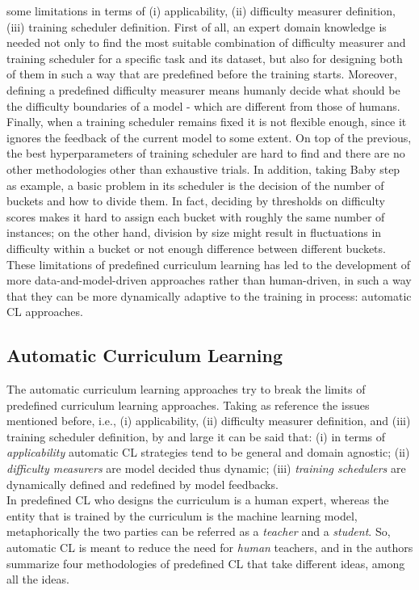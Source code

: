 some limitations in terms of (i) applicability, (ii) difficulty measurer definition, (iii) training scheduler definition.
First of all, an expert domain knowledge is needed not only to find the most suitable
combination of difficulty measurer and training scheduler for a specific task and its dataset, 
but also for designing both of them in such a way that are predefined before the training starts.
Moreover, defining a predefined difficulty measurer means humanly decide what should be the difficulty boundaries of a model - which are
different from those of humans. Finally, when a training scheduler remains fixed 
it is not flexible enough, since it ignores the feedback of the current model to some extent.
On top of the previous, the best hyperparameters of training scheduler are hard to find and there are no 
other methodologies other than exhaustive trials. In addition, taking Baby step as example, 
a basic problem in its scheduler is the decision of the number of buckets and how to divide them. In fact, 
deciding by thresholds on difficulty scores makes it hard to assign each bucket with roughly the same number of instances; on 
the other hand, division by size might result in fluctuations in difficulty within a bucket or not enough difference between different 
buckets.\\

These limitations of predefined curriculum learning has led to the development 
of more data-and-model-driven approaches rather than human-driven, in such a way 
that they can be more dynamically adaptive to the training in process: automatic 
CL approaches.

\subsection{Automatic Curriculum Learning}
The automatic curriculum learning approaches try to break the limits of predefined curriculum learning approaches.
Taking as reference the issues mentioned before, i.e., (i) applicability, (ii) difficulty measurer definition, and (iii) training scheduler definition, 
by and large it can be said that: (i) in terms of \textit{applicability} automatic CL strategies 
tend to be general and domain agnostic; (ii) \textit{difficulty measurers} are model decided thus dynamic; (iii) \textit{training schedulers}
are dynamically defined and redefined by model feedbacks.\\
In predefined CL who designs the curriculum is a human expert, whereas the entity that is trained
by the curriculum is the machine learning model, metaphorically the two parties can be referred as 
a \textit{teacher} and a \textit{student}. So, automatic CL is meant
to reduce the need for \textit{human} teachers, and in \cite{wang2021survey} the authors summarize 
four methodologies of predefined CL that take different ideas, among all the ideas.

